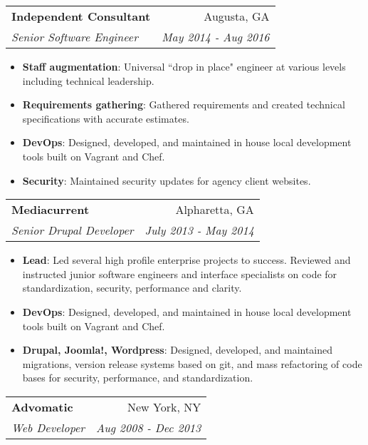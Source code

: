 \documentclass[letterpaper,11pt]{article}
\makeatletter
\newcommand{\resumeItem}[2]{
  \item\small{
    \textbf{#1}{: #2 \vspace{-2pt}}
  }
}
\newcommand{\resumeSubheading}[4]{
  \vspace{-1pt}\item
    \begin{tabular*}{0.97\textwidth}{l@{\extracolsep{\fill}}r}
      \textbf{#1} & #2 \\
      \textit{\small#3} & \textit{\small #4} \\
    \end{tabular*}\vspace{-5pt}
}
\newcommand{\resumeItemListStart}{\begin{itemize}}
\newcommand{\resumeItemListEnd}{\end{itemize}\vspace{-5pt}}
\makeatother
\begin{document}
    \resumeSubheading
      {Independent Consultant}{Augusta, GA}
      {Senior Software Engineer}{May 2014 - Aug 2016}
      \resumeItemListStart
        \resumeItem{Staff augmentation}
          {Universal ``drop in place" engineer at various levels including technical leadership.}
        \resumeItem{Requirements gathering}
          {Gathered requirements and created technical specifications with accurate estimates.}
        \resumeItem{DevOps}
          {Designed, developed, and maintained in house local development tools built on Vagrant and Chef.}
        \resumeItem{Security}
          {Maintained security updates for agency client websites.}
      \resumeItemListEnd

    \resumeSubheading
      {Mediacurrent}{Alpharetta, GA}
      {Senior Drupal Developer}{July 2013 - May 2014}
      \resumeItemListStart
        \resumeItem{Lead}
          {Led several high profile enterprise projects to success. Reviewed and instructed junior software engineers and interface specialists on code for standardization, security, performance and clarity.}
        \resumeItem{DevOps}
          {Designed, developed, and maintained in house local development tools built on Vagrant and Chef.}
        \resumeItem{Drupal, Joomla!, Wordpress}
          {Designed, developed, and maintained migrations, version release systems based on git, and mass refactoring of code bases for security, performance, and standardization.}
      \resumeItemListEnd

    \resumeSubheading
      {Advomatic}{New York, NY}
      {Web Developer}{Aug 2008 - Dec 2013}

\end{document}
